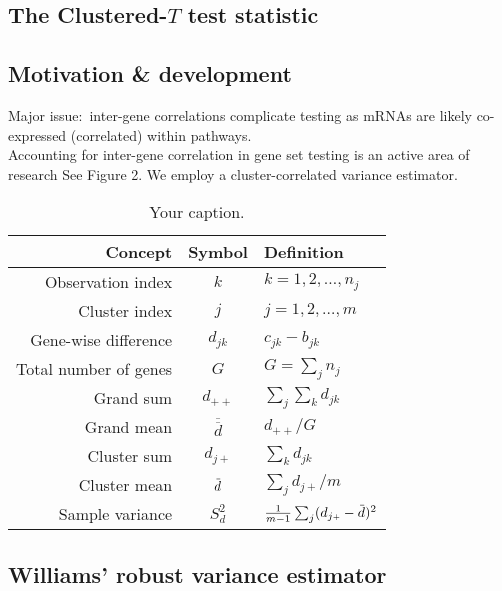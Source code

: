 \documentclass[a0,portrait]{a0poster}
\newcommand*{\barbar}[1]{\overline{\overline{#1}}}
\newcommand{\overbar}[1]{\mkern 3mu\overline{\mkern-3mu#1\mkern-1.mu}\mkern 1.mu}
\begin{document}
\begin{multicols}{3}
\section{The Clustered-$T$ test statistic}
\subsection{Motivation \& development}

Major issue:~inter-gene correlations complicate testing as mRNAs are likely co-expressed (correlated) within pathways.\\
Accounting for inter-gene correlation in gene set testing is an active area of research\cite{Tamayo2016} See Figure 2.
We employ a cluster-correlated variance estimator\cite{Williams2000}.

\begin{table}[h]
  \begin{tabular}{r | c | l }
    Concept & Symbol & Definition \\
    \hline \hline
      Observation index & $k$ & $k = 1,2,\ldots,n_j$ \\
      Cluster index & $j$ & $j = 1,2,\ldots,m$ \\
      Gene-wise difference & $d_{jk}$ & $c_{jk} - b_{jk}$ \\
      Total number of genes & $G$ & $G = \sum_{j} n_{j}$ \\
      Grand sum & $d_{\scriptscriptstyle{++}}$ & $\sum_j \sum_k d_{jk}$ \\
      Grand mean & $\barbar{d}$ & $d_{\scriptscriptstyle{++}}/G$ \\
      Cluster sum & $d_{j\scriptscriptstyle{+}}$ & $\sum_k d_{jk}$ \\
      Cluster mean & $\overbar{d}$ & $\sum_j d_{j\scriptscriptstyle{+}}/m$ \\
    Sample variance & $S_{d}^{2}$ & $\frac{1}{m-1}\sum_j(d_{j\scriptscriptstyle{+}} - \overbar{d})^2$\\
  \end{tabular}
  \caption{\label{tab:table-name}Your caption.}
  \end{table}



\subsection{Williams' robust variance estimator\cite{Williams2000}}


\end{multicols}
\end{document}
